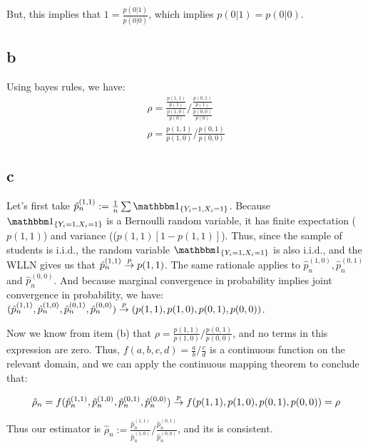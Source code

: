 \documentclass[12pt]{paper}
\begin{document}
But, this implies that $1=\frac{p(0|1)}{p(0|0)}$, which implies $p(0|1)=p(0|0)$.

\subsection*{b}

Using bayes rules, we have:
\begin{equation}
\begin{split}
\rho=\frac{\frac{p(1,1)}{p(1)}}{\frac{p(1,0)}{p(0)}}\Big/\frac{\frac{p(0,1)}{p(1)}}{\frac{p(0,0)}{p(0)}}\\
\rho=\frac{p(1,1)}{p(1,0)}\Big/\frac{p(0,1)}{p(0,0)}
\end{split}
\end{equation}

\subsection*{c}

Let's first take $\hat{p}_{n}^{(1,1)}:=\frac{1}{n}\sum{\indicate{Y_i=1,X_i=1}}$. Because $\indicate{Y_i=1,X_i=1}$ is a Bernoulli random variable, it has finite expectation ($p(1,1)$) and variance (($p(1,1)[1-p(1,1)]$). Thus, since the sample of students is i.i.d., the random variable $\indicate{Y_i=1,X_i=1}$ is also i.i.d., and the WLLN gives us that $\hat{p}_{n}^{(1,1)}\overset{p}{\to} p(1,1)$. The same rationale applies to $\hat{p}_{n}^{(1,0)},\hat{p}_{n}^{(0,1)}$ and $\hat{p}_{n}^{(0,0)}$. And because marginal convergence in probability implies joint convergence in probability, we have: $(\hat{p}_{n}^{(1,1)},\hat{p}_{n}^{(1,0)},\hat{p}_{n}^{(0,1)},\hat{p}_{n}^{(0,0)})\overset{p}{\to}(p(1,1),p(1,0),p(0,1),p(0,0))$. 

Now we know from item (b) that $\rho=\frac{p(1,1)}{p(1,0)}\Big/\frac{p(0,1)}{p(0,0)}$, and no terms in this expression are zero. Thus, $f(a,b,c,d)=\frac{a}{b}\Big/\frac{c}{d}$ is a continuous function on the relevant domain, and we can apply the continuous mapping theorem to conclude that:

\begin{equation}
\hat{\rho}_n=f(\hat{p}_{n}^{(1,1)},\hat{p}_{n}^{(1,0)},\hat{p}_{n}^{(0,1)},\hat{p}_{n}^{(0,0)})\overset{p}{\to} f(p(1,1),p(1,0),p(0,1),p(0,0))=\rho
\end{equation}

Thus our estimator is $\hat{\rho}_n :=\frac{\hat{p}_{n}^{(1,1)}}{\hat{p}_{n}^{(1,0)}}\Big/\frac{\hat{p}_{n}^{(0,1)}}{\hat{p}_{n}^{(0,0)}}$, and its is consistent.
\end{document}
